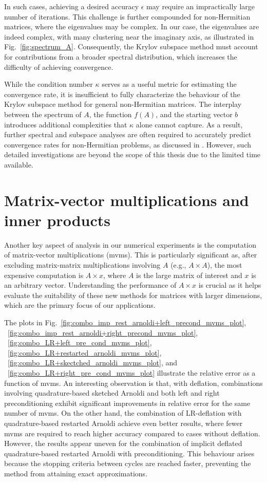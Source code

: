 In such cases, achieving a desired accuracy $ \epsilon $ may require an impractically large number of iterations. This challenge is further compounded for non-Hermitian matrices, where the eigenvalues may be complex. In our case, the eigenvalues are indeed complex, with many clustering near the imaginary axis, as illustrated in Fig.~\ref{fig:spectrum_A}. Consequently, the Krylov subspace method must account for contributions from a broader spectral distribution, which increases the difficulty of achieving convergence.

While the condition number $ \kappa $ serves as a useful metric for estimating the convergence rate, it is insufficient to fully characterize the behaviour of the Krylov subspace method for general non-Hermitian matrices. The interplay between the spectrum of $ A $, the function $ f(A) $, and the starting vector $ b $ introduces additional complexities that $ \kappa $ alone cannot capture. As a result, further spectral and subspace analyses are often required to accurately predict convergence rates for non-Hermitian problems, as discussed in \cite{38}. However, such detailed investigations are beyond the scope of this thesis due to the limited time available.

\section{Matrix-vector multiplications and inner products}
\label{sec:mvms_and_inner_pdt}

Another key aspect of analysis in our numerical experiments is the computation of matrix-vector multiplications (mvms). This is particularly significant as, after excluding matrix-matrix multiplications involving $A$ (e.g., $A \times A$), the most expensive computation is $A \times x$, where $A$ is the large matrix of interest and $x$ is an arbitrary vector. Understanding the performance of $A \times x$ is crucial as it helps evaluate the suitability of these new methods for matrices with larger dimensions, which are the primary focus of our applications.

The plots in Fig.~\ref{fig:combo_imp_rest_arnoldi+left_precond_mvms_plot}, ~\ref{fig:combo_imp_rest_arnoldi+right_precond_mvms_plot}, ~\ref{fig:combo_LR+left_pre_cond_mvms_plot}, ~\ref{fig:combo_LR+restarted_arnoldi_mvms_plot}, ~\ref{fig:combo_LR+skectched_arnoldi_mvms_plot}, and ~\ref{fig:combo_LR+right_pre_cond_mvms_plot} illustrate the relative error as a function of mvms. An interesting observation is that, with deflation, combinations involving quadrature-based sketched Arnoldi and both left and right preconditioning exhibit significant improvements in relative error for the same number of mvms. On the other hand, the combination of LR-deflation with quadrature-based restarted Arnoldi achieve even better results, where fewer mvms are required to reach higher accuracy compared to cases without deflation. However, the results appear uneven for the combination of implicit deflated quadrature-based restarted Arnoldi with preconditioning. This behaviour arises because the stopping criteria between cycles are reached faster, preventing the method from attaining exact approximations.


